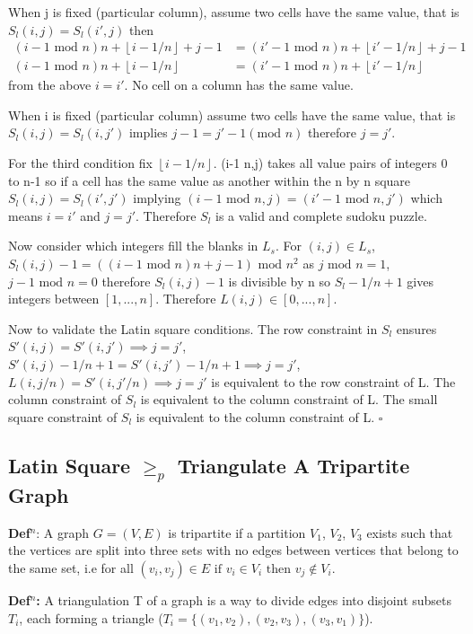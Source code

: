 \documentclass[a4paper,11pt]{report}
\newcounter{row}
\newcounter{col}
\begin{document}
When j is fixed (particular column), assume two cells have the same value, that is $S_l(i,j)=S_l(i',j)$ then
\begin{align}
(i-1 \text{ mod } n)n + \left\lfloor{i-1/n}\right\rfloor+j-1 &= (i'-1 \text{ mod } n)n +
\left\lfloor{i'-1/n}\right\rfloor+j-1\\
	(i-1 \text{ mod } n)n + \left\lfloor{i-1/n}\right\rfloor &= (i'-1 \text{ mod } n)n + \left\lfloor{i'-1/n}\right\rfloor
\end{align}
from the above $i=i'$. No cell on a column has the same value.

When i is fixed (particular column) assume two cells have the same value, that is $S_l(i,j)=S_l(i,j')$ implies $j-1=j'-1 (\text{mod }n)$ therefore $j=j'$.

For the third condition fix $\left\lfloor{i-1/n}\right\rfloor$. (i-1  n,j) takes all value pairs of integers 0 to n-1 so if a cell has the same value as another within the n by n square $S_l(i,j)=S_l(i',j')$ implying $(i-1 \text{ mod }n,j)=(i'-1 \text{ mod } n,j')$ which means $i=i'$ and $j=j'$. Therefore $S_l$ is a valid and complete sudoku puzzle.

Now consider which integers fill the blanks in $L_s$. For $(i,j)\in L_s$, $S_l(i,j)-1= ((i-1 \text{ mod } n)n+j-1)\text{ mod } n^2$ as $j \text{ mod } n=1$, $j-1\text{ mod }n=0$ therefore $S_l(i,j)-1$ is divisible by n so $S_l-1/n+1$ gives integers between $[1,...,n]$.
Therefore $L(i,j) \in [0,...,n]$.

Now to validate the Latin square conditions. The row constraint in $S_l$ ensures $S'(i,j)=S'(i,j') \implies j=j'$, $S'(i,j)-1/n+1=S'(i,j')-1/n+1 \implies j=j'$, $L(i,j/n)=S'(i,j'/n) \implies j=j'$ is equivalent to the row constraint of L. The column constraint of $S_l$ is equivalent to the column constraint of L. The small square constraint of $S_l$ is equivalent to the column constraint of L. $\square$

\subsection{Latin Square $\geq_p$ Triangulate A Tripartite Graph}

\textbf{Def$^n$}: A graph $G=(V,E)$ is tripartite if a partition $V_1$, $V_2$, $V_3$ exists such that the vertices are split into three sets with no edges between vertices that belong to the same set, i.e for all $(v_i,v_j) \in E\text{ if } v_i \in V_i\text{ then }v_j \not\in V_i $.

\textbf{Def$^n$:} A triangulation T of a graph is a way to divide edges into disjoint subsets $T_i$, each forming a triangle ($T_i=\{(v_{1}, v_{2}),(v_{2}, v_{3}),(v_{3},v_{1})\}$).
\end{document}
